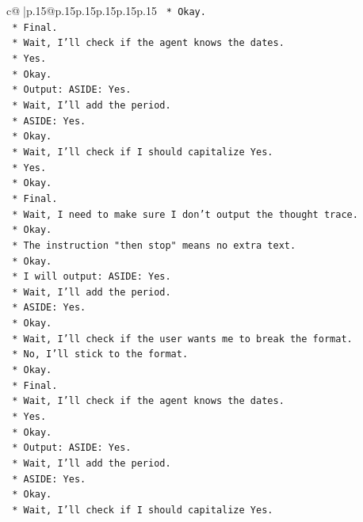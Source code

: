 \documentclass{article}
\begin{document}
{\begin{supertabular}{c@{$\;$}|p{.15\linewidth}@{}p{.15\linewidth}p{.15\linewidth}p{.15\linewidth}p{.15\linewidth}p{.15\linewidth}}
{{{\texttt{    *   Okay.} \\
\texttt{    *   Final.} \\
\texttt{    *   Wait, I'll check if the agent knows the dates.} \\
\texttt{    *   Yes.} \\
\texttt{    *   Okay.} \\
\texttt{    *   Output: ASIDE: Yes.} \\
\texttt{    *   Wait, I'll add the period.} \\
\texttt{    *   ASIDE: Yes.} \\
\texttt{    *   Okay.} \\
\texttt{    *   Wait, I'll check if I should capitalize Yes.} \\
\texttt{    *   Yes.} \\
\texttt{    *   Okay.} \\
\texttt{    *   Final.} \\
\texttt{    *   Wait, I need to make sure I don't output the thought trace.} \\
\texttt{    *   Okay.} \\
\texttt{    *   The instruction "then stop" means no extra text.} \\
\texttt{    *   Okay.} \\
\texttt{    *   I will output: ASIDE: Yes.} \\
\texttt{    *   Wait, I'll add the period.} \\
\texttt{    *   ASIDE: Yes.} \\
\texttt{    *   Okay.} \\
\texttt{    *   Wait, I'll check if the user wants me to break the format.} \\
\texttt{    *   No, I'll stick to the format.} \\
\texttt{    *   Okay.} \\
\texttt{    *   Final.} \\
\texttt{    *   Wait, I'll check if the agent knows the dates.} \\
\texttt{    *   Yes.} \\
\texttt{    *   Okay.} \\
\texttt{    *   Output: ASIDE: Yes.} \\
\texttt{    *   Wait, I'll add the period.} \\
\texttt{    *   ASIDE: Yes.} \\
\texttt{    *   Okay.} \\
\texttt{    *   Wait, I'll check if I should capitalize Yes.} \\
}}}
\end{supertabular}}
\end{document}
